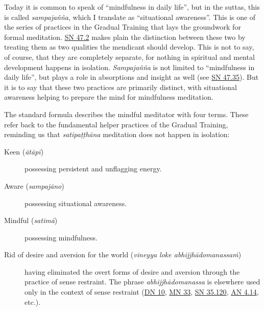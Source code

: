 \documentclass[12pt,openany]{book}%
\begin{document}
Today it is common to speak of “mindfulness in daily life”, but in the suttas, this is called \textit{\textsanskrit{sampajañña}}, which I translate as “situational awareness”. This is one of the series of practices in the Gradual Training that lays the groundwork for formal meditation. \href{https://suttacentral.net/sn47.2}{SN 47.2} makes plain the distinction between these two by treating them as two qualities the mendicant should develop. This is not to say, of course, that they are completely separate, for nothing in spiritual and mental development happens in isolation. \textit{\textsanskrit{Sampajañña}} is not limited to “mindfulness in daily life”, but plays a role in absorptions and insight as well (see \href{https://suttacentral.net/sn47.35}{SN 47.35}). But it is to say that these two practices are primarily distinct, with situational awareness helping to prepare the mind for mindfulness meditation.

The standard formula describes the mindful meditator with four terms. These refer back to the fundamental helper practices of the Gradual Training, reminding us that \textit{\textsanskrit{satipaṭṭhāna}} meditation does not happen in isolation:

\begin{description}%
\item[Keen (\textit{\textsanskrit{ātāpī}})] possessing persistent and unflagging energy.%
\item[Aware (\textit{\textsanskrit{sampajāno}})] possessing situational awareness.%
\item[Mindful (\textit{\textsanskrit{satimā}})] possessing mindfulness.%
\item[Rid of desire and aversion for the world (\textit{vineyya loke \textsanskrit{abhijjhādomanassaṁ}})] having eliminated the overt forms of desire and aversion through the practice of sense restraint. The phrase \textit{\textsanskrit{abhijjhādomanassa}} is elsewhere used only in the context of sense restraint (\href{https://suttacentral.net/dn10}{DN 10}, \href{https://suttacentral.net/mn33}{MN 33}, \href{https://suttacentral.net/sn35.120}{SN 35.120}, \href{https://suttacentral.net/an4.14}{AN 4.14}, etc.).%
\end{description}
\end{document}
